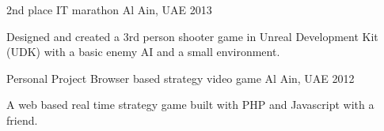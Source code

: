 \begin{cventries}

    \cventry
    {2nd place} %
    {IT marathon} %
    {Al Ain, UAE} %
    {2013} %
    {
        \begin{cvitems}
            \item {Designed and created a 3rd person shooter game in Unreal Development Kit (UDK) with a basic enemy AI and a small environment.}
        \end{cvitems}
    }



    \cventry
    {Personal Project} %
    {Browser based strategy video game} %
    {Al Ain, UAE} %
    {2012} %
    {
        \begin{cvitems}
            \item {A web based real time strategy game built with PHP and Javascript with a friend.}
        \end{cvitems}
    }


\end{cventries}